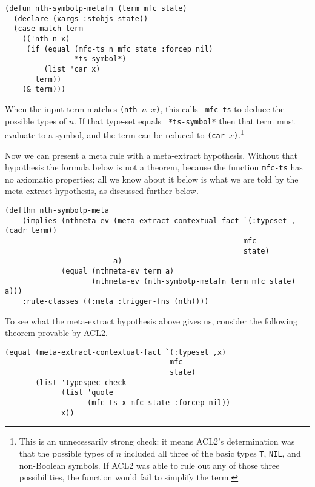 \begin{verbatim}
(defun nth-symbolp-metafn (term mfc state)
  (declare (xargs :stobjs state))
  (case-match term
    (('nth n x)
     (if (equal (mfc-ts n mfc state :forcep nil)
                *ts-symbol*)
         (list 'car x)
       term))
    (& term)))
\end{verbatim}

\noindent When the input term matches {\tt (nth $n$ $x$)}, this calls
\href{http://www.cs.utexas.edu/users/moore/acl2/manuals/current/manual/index.html?topic=ACL2\_\_\_\_MFC-TS}{\underline{\tt
    mfc-ts}}
to deduce the possible types of $n$.  If that type-set equals {\tt
  *ts-symbol*} then that term must evaluate to a symbol, and the term
can be reduced to {\tt (car $x$)}.\footnote{This is an unnecessarily strong check: it means ACL2's determination
was that the possible types of $n$ included all three of the basic
types {\tt T}, {\tt NIL}, and non-Boolean symbols.  If ACL2 was able
to rule out any of those three possibilities, the function would
fail to simplify the term.}

Now we can present a meta rule with a meta-extract
hypothesis.  Without that hypothesis the formula below is
not a theorem, because the function {\tt mfc-ts} has no axiomatic
properties; all we know about it below is what we are told by the
meta-extract hypothesis, as discussed further below.

\begin{verbatim}
(defthm nth-symbolp-meta
    (implies (nthmeta-ev (meta-extract-contextual-fact `(:typeset ,(cadr term))
                                                       mfc
                                                       state)
                         a)
             (equal (nthmeta-ev term a)
                    (nthmeta-ev (nth-symbolp-metafn term mfc state) a)))
    :rule-classes ((:meta :trigger-fns (nth))))
\end{verbatim}

\noindent To see what the meta-extract hypothesis above gives us, consider the
following theorem provable by ACL2.

\begin{verbatim}
(equal (meta-extract-contextual-fact `(:typeset ,x)
                                      mfc
                                      state)
       (list 'typespec-check
             (list 'quote
                   (mfc-ts x mfc state :forcep nil))
             x))
\end{verbatim}

